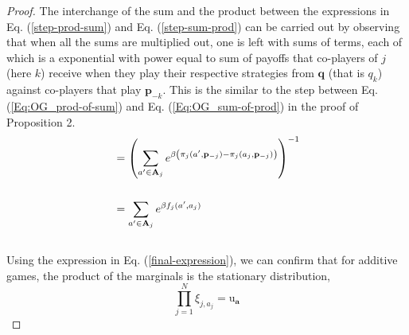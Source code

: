 \documentclass[11pt]{article}
\theoremstyle{plainCl1}
\theoremstyle{plainCl2}
\newcommand{\A}{\mathbf{A}}
\newcommand{\abf}{\mathbf{a}}
\newcommand{\qbf}{\mathbf{q}}
\newcommand{\pbf}{\mathbf{p}}
\begin{document}
\begin{proof}
\noindent The interchange of the sum and the product between the expressions in Eq. (\ref{step-prod-sum}) and Eq. (\ref{step-sum-prod}) can be carried out by observing that when all the sums are multiplied out, one is left with sums of terms, each of which is a exponential with power equal to sum of payoffs that co-players of $j$ (here $k$) receive when they play their respective strategies from $\qbf$ (that is $q_k$) against co-players that play $\pbf_{-k}$. This is the similar to the step between Eq. (\ref{Eq:OG_prod-of-sum}) and Eq. (\ref{Eq:OG_sum-of-prod}) in the proof of Proposition 2. 
\begin{align}
&= \left( \sum_{a' \in \A_j} \displaystyle e^{\beta \left( \pi_j(a',\pbf_{-j}) - \pi_j(a_j,\pbf_{-j})\right)} \right)^{-1}\\ \notag \\
\label{final-expression}
&= \sum_{a' \in \A_j} \displaystyle e^{\beta f_j(a',a_j)}
\end{align} \\
\noindent Using the expression in Eq. (\ref{final-expression}), we can confirm that for additive games, the product of the marginals is the stationary distribution,  
\begin{equation}
\prod_{j=1}^N \xi_{j,a_j} = \mathrm{u}_\abf
\end{equation} 
\end{proof}
\end{document}
